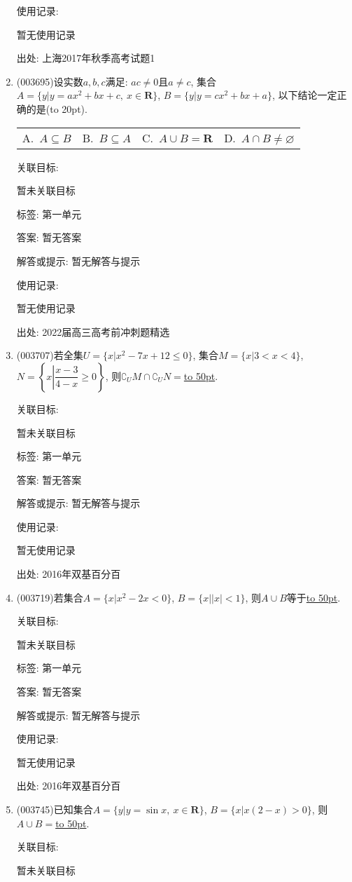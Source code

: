 \documentclass[10pt,a4paper]{article}
\newcommand{\blank}[1]{\underline{\hbox to #1pt{}}}
\newcommand{\bracket}[1]{(\hbox to #1pt{})}
\newcommand{\fourch}[4]{\par\begin{tabular}{p{.23\textwidth}p{.23\textwidth}p{.23\textwidth}p{.23\textwidth}}
A.~#1 &B.~#2& C.~#3& D.~#4
\end{tabular}}
\begin{document}
\begin{enumerate}[1.]
使用记录:

暂无使用记录


出处: 上海2017年秋季高考试题1
\item { (003695)}设实数$a,b,c$满足: $ac\ne 0$且$a\ne c$, 集合$A=\{y|y=ax^2+bx+c, \ x\in \mathbf{R}\}$, $B=\{y|y=cx^2+bx+a\}$, 以下结论一定正确的是\bracket{20}.
\fourch{$A\subseteq B$}{$B\subseteq A$}{$A\cup B=\mathbf{R}$}{$A\cap B\ne\varnothing$}


关联目标:

暂未关联目标



标签: 第一单元

答案: 暂无答案

解答或提示: 暂无解答与提示

使用记录:

暂无使用记录


出处: 2022届高三高考前冲刺题精选
\item { (003707)}若全集$U=\{x|x^2-7x+12\le 0\}$, 集合$M=\{x|3<x<4\}$, $N=\left\{x\left|\dfrac{x-3}{4-x}\ge 0\right.\right\}$, 则$\complement_U M\cap \complement_U N=$\blank{50}.


关联目标:

暂未关联目标



标签: 第一单元

答案: 暂无答案

解答或提示: 暂无解答与提示

使用记录:

暂无使用记录


出处: 2016年双基百分百
\item { (003719)}若集合$A=\{x|x^2-2x<0\}$, $B=\{x||x|<1\}$, 则$A\cup B$等于\blank{50}.


关联目标:

暂未关联目标



标签: 第一单元

答案: 暂无答案

解答或提示: 暂无解答与提示

使用记录:

暂无使用记录


出处: 2016年双基百分百
\item { (003745)}已知集合$A=\{y|y=\sin x, \ x\in \mathbf{R}\}$, $B=\{x|x(2-x)>0\}$, 则$A\cup B=$\blank{50}.


关联目标:

暂未关联目标




\end{enumerate}
\end{document}

